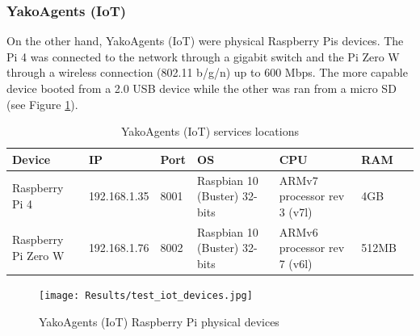         \subsubsection{YakoAgents (IoT)}
            On the other hand, YakoAgents (IoT) were physical Raspberry Pis devices. The Pi 4 was connected to the network through a gigabit switch and the Pi Zero W through a wireless connection (802.11 b/g/n) up to 600 Mbps. The more capable device booted from a 2.0 USB device while the other was ran from a micro SD (see Figure \ref{fig:test_iot_devices}).
            
            \begin{table}[H]
                \centering
                \caption{YakoAgents (IoT) services locations}
                \label{tab:test_yakoagentsiot}
                \begin{tabularx}{\linewidth}{|X|l|l|X|X|l|X|}
                    \hline
                    \rowcolor[HTML]{C0C0C0}
                    \textbf{Device} & \textbf{IP} & \textbf{Port} & \textbf{OS} & \textbf{CPU} & \textbf{RAM} \\ \hline
                    Raspberry Pi 4 & 192.168.1.35 & 8001 & Raspbian 10 (Buster) 32-bits & ARMv7 processor rev 3 (v7l) & 4GB\\ \hline
                    Raspberry Pi Zero W & 192.168.1.76 & 8002 & Raspbian 10 (Buster) 32-bits & ARMv6 processor rev 7 (v6l) & 512MB \\ \hline
                \end{tabularx}
            \end{table}
            
            \begin{figure}[H]
                \centering
                \texttt{[image: Results/test\_iot\_devices.jpg]}
                \caption{YakoAgents (IoT) Raspberry Pi physical devices}
                \label{fig:test_iot_devices}
            \end{figure}
        
